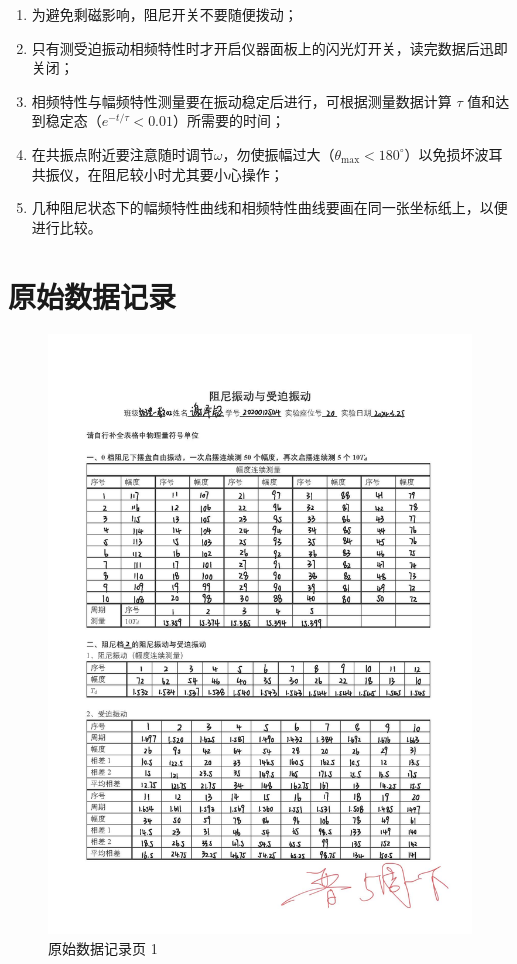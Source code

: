 \documentclass[12pt,a4paper]{amsart}
\begin{document}
\begin{enumerate}
	\item 为避免剩磁影响，阻尼开关不要随便拨动；
	\item 只有测受迫振动相频特性时才开启仪器面板上的闪光灯开关，读完数据后迅即关闭；
	\item 相频特性与幅频特性测量要在振动稳定后进行，可根据测量数据计算 $\tau$ 值和达到稳定态（$e^{-t/\tau}<0.01$）所需要的时间；
	\item 在共振点附近要注意随时调节$\omega$，勿使振幅过大（$\theta_{\text{max}}<180^\circ$）以免损坏波耳共振仪，在阻尼较小时尤其要小心操作；
	\item 几种阻尼状态下的幅频特性曲线和相频特性曲线要画在同一张坐标纸上，以便进行比较。
\end{enumerate}

\section{原始数据记录}\label{sec:original_data}

\begin{figure}[h]
	\centering
	\includegraphics[width=1.0\textwidth]{img/original_data_page_1.jpg}
	\caption{原始数据记录页 1}
	\label{fig:original_data_page_1}
\end{figure}
\end{document}
